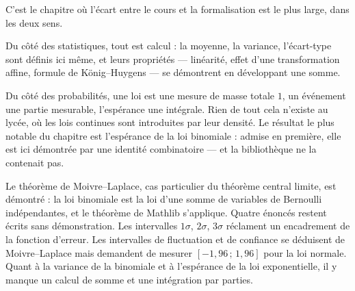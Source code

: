 C'est le chapitre où l'écart entre le cours et la formalisation est le plus large, dans les
deux sens.

Du côté des statistiques, tout est calcul : la moyenne, la variance, l'écart-type sont définis
ici même, et leurs propriétés — linéarité, effet d'une transformation affine, formule de
König--Huygens — se démontrent en développant une somme.

Du côté des probabilités, une loi est une mesure de masse totale $1$, un événement une partie
mesurable, l'espérance une intégrale. Rien de tout cela n'existe au lycée, où les lois
continues sont introduites par leur densité. Le résultat le plus notable du chapitre est
l'espérance de la loi binomiale : admise en première, elle est ici démontrée par une identité
combinatoire — et la bibliothèque ne la contenait pas.

Le théorème de Moivre--Laplace, cas particulier du théorème central limite, est démontré :
la loi binomiale est la loi d'une somme de variables de Bernoulli indépendantes, et le
théorème de Mathlib s'applique. Quatre énoncés restent écrits sans démonstration. Les
intervalles $1\sigma$, $2\sigma$, $3\sigma$ réclament un encadrement de la fonction
d'erreur. Les intervalles de fluctuation et de confiance se déduisent de Moivre--Laplace
mais demandent de mesurer $[-1{,}96\,;\,1{,}96]$ pour la loi normale. Quant à la variance
de la binomiale et à l'espérance de la loi exponentielle, il y manque un calcul de somme et
une intégration par parties.
